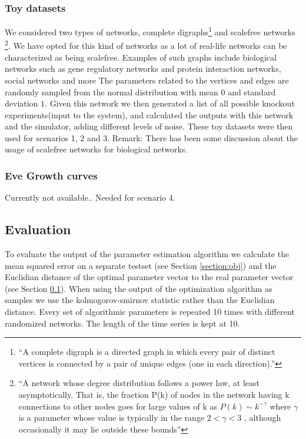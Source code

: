  \subsubsection{Toy datasets}
 We considered two types of networks, complete digraphs\footnote{``A complete digraph is a directed graph in which every pair of distinct vertices is connected by a pair of unique edges (one in each direction).''} and scalefree networks
\footnote{``A network whose degree distribution follows a power law, at least asymptotically. That is, the fraction P(k) of nodes in the network having k connections to other nodes goes for large values of k as 
$ P(k) \sim k^{-\gamma} $ where $\gamma$ is a parameter whose value is typically in the range $2 < \gamma < 3$ \cite{barabasi2004network}, although occasionally it may lie outside these bounds''}. We have opted for this
kind of networks as a lot of real-life networks can be characterized as being scalefree. Examples of such graphs include biological networks such as gene regulatory networks and protein interaction networks, social networks and more \cite{barabasi2009scale}
The parameters related to the vertices and edges are randomly sampled from the normal distribution with mean $0$ and standard deviation $1$. Given this network we then generated a list of all possible knockout experiments(input to the system), and
calculated the outputs with this network and the simulator, adding different levels of noise. These toy datasets were then used for scenarios 1, 2 and 3.
Remark: There has been some discussion about the usage of scalefree networks \cite{LimaMendez09} for biological networks.
 \subsubsection{Eve Growth curves}
 Currently not available.. Needed for scenario 4.
 \subsection{Evaluation}\label{sec:eval} 
To evaluate the output of the parameter estimation algorithm we calculate the mean squared error on a separate testset (see Section \ref{section:obj}) and the Euclidian distance of the optimal
parameter vector to the real parameter vector (see Section \ref{sec:eval}). When using the output of the optimization algorithm as samples we use the kolmogorov-smirnov statistic rather than
the Euclidian distance.
Every set of algorithmic parameters is repeated 10 times with different randomized networks. The length of the time series is kept at 10.

